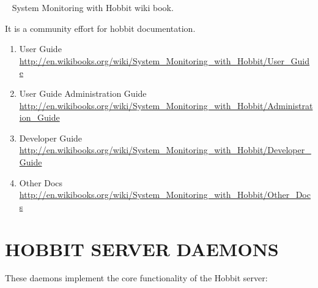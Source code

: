~\cite{wikibook:wikibooktjyang} System Monitoring with Hobbit wiki book.

It is a community effort for hobbit documentation.

\begin{enumerate}

\item User Guide  \url{http://en.wikibooks.org/wiki/System_Monitoring_with_Hobbit/User_Guide}

\item User Guide Administration Guide
  \url{http://en.wikibooks.org/wiki/System_Monitoring_with_Hobbit/Administration_Guide}

\item Developer Guide \url{http://en.wikibooks.org/wiki/System_Monitoring_with_Hobbit/Developer_Guide}

\item Other Docs
\url{http://en.wikibooks.org/wiki/System_Monitoring_with_Hobbit/Other_Docs}

\end{enumerate}

\section{HOBBIT SERVER DAEMONS}
 These daemons implement the core functionality of the Hobbit server: 

